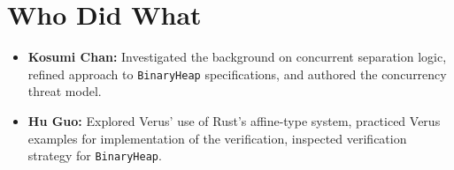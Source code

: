 \documentclass[conference]{IEEEtran}
\begin{document}
\section{Who Did What}
\begin{itemize}
\item \textbf{Kosumi Chan:} Investigated the background on concurrent separation logic, refined approach to \texttt{BinaryHeap} specifications, and authored the concurrency threat model.
\item \textbf{Hu Guo:} Explored Verus' use of Rust's affine-type system, practiced Verus examples for implementation of the verification, inspected verification strategy for \texttt{BinaryHeap}.
\end{itemize}
\printbibliography
\end{document}
